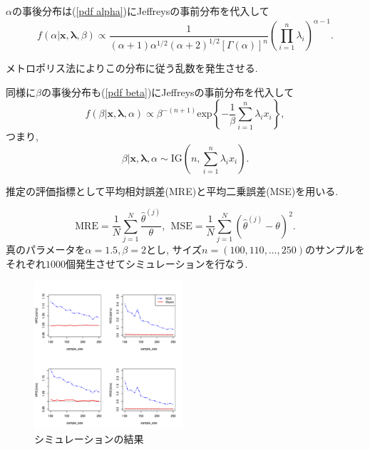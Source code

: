 \documentclass[12pt,dvipdfmx]{beamer}
\begin{document}
\begin{frame}
$\alpha$の事後分布は(\ref{pdf alpha})にJeffreysの事前分布を代入して
$$
f(\alpha|\bm{x},\bm{\lambda},\beta )
\propto
\frac{1}{(\alpha +1)\alpha ^{1/2}(\alpha +2)^{1/2}[\Gamma(\alpha )]^n}
\left(\prod_{i=1}^n\lambda _i \right)^{\alpha -1} .
$$

メトロポリス法によりこの分布に従う乱数を発生させる.
\end{frame}



\begin{frame}
同様に$\beta$の事後分布も(\ref{pdf beta})にJeffreysの事前分布を代入して
$$
f(\beta |\bm{x},\bm{\lambda },\alpha )
\propto
\beta ^{-(n+1)}\mbox{exp}\left\{-
\frac{1}{\beta }\sum_{i=1}^n \lambda_i x_i\right\} ,
$$
つまり, 
$$
\beta |\bm{x},\bm{\lambda },\alpha
\sim
\mbox{IG}\left(n,\sum_{i=1}^n\lambda _i x_i \right). 
$$



\end{frame}


\begin{frame}


推定の評価指標として平均相対誤差(MRE)と平均二乗誤差(MSE)を用いる.

$$
\mbox{MRE} = \frac{1}{N}\sum_{j=1}^{N}\frac{\hat{\theta}^{(j)}}{\theta}, ~~
\mbox{MSE} = \frac{1}{N}\sum_{j=1}^{N}(\hat{\theta}^{(j)} - \theta)^2. 
$$
真のパラメータを$\alpha = 1.5, \beta = 2$とし, サイズ$n = (100,110,\ldots,250)$のサンプルをそれぞれ$1000$個発生させてシミュレーションを行なう.

\end{frame}




\begin{frame}
\begin{figure}[ht]
\begin{center}
\includegraphics[width=55mm]{result}
\caption{シミュレーションの結果}
\end{center}
\end{figure}
\end{frame}
\end{document}
